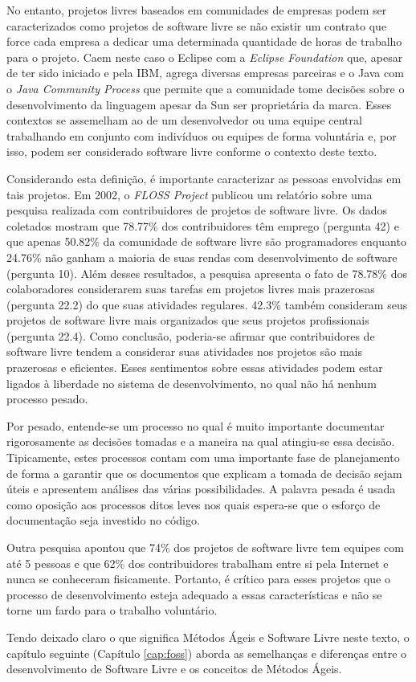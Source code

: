 No entanto, projetos livres baseados em comunidades de empresas podem
ser caracterizados como projetos de software livre se não existir um
contrato que force cada empresa a dedicar uma determinada quantidade
de horas de trabalho para o projeto. Caem neste caso o Eclipse com a
\emph{Eclipse Foundation} que, apesar de ter sido iniciado e pela IBM,
agrega diversas empresas parceiras e o Java com o \emph{Java Community
  Process} que permite que a comunidade tome decisões sobre o
desenvolvimento da linguagem apesar da Sun ser proprietária da
marca. Esses contextos se assemelham ao de um desenvolvedor ou uma
equipe central trabalhando em conjunto com indivíduos ou equipes de
forma voluntária e, por isso, podem ser considerado software livre
conforme o contexto deste texto.

Considerando esta definição, é importante caracterizar as pessoas
envolvidas em tais projetos. Em 2002, o \emph{FLOSS Project}
\cite{FlossProject} publicou um relatório sobre uma pesquisa realizada
com contribuidores de projetos de software livre. Os dados coletados
\cite{FlossStats} mostram que 78.77\% dos contribuidores têm emprego
(pergunta 42) e que apenas 50.82\% da comunidade de software livre são
programadores enquanto 24.76\% não ganham a maioria de suas rendas com
desenvolvimento de software (pergunta 10). Além desses resultados, a
pesquisa apresenta o fato de 78.78\% dos colaboradores considerarem
suas tarefas em projetos livres mais prazerosas (pergunta 22.2) do que
suas atividades regulares. 42.3\% também consideram seus projetos de
software livre mais organizados que seus projetos profissionais
(pergunta 22.4). Como conclusão, poderia-se afirmar que contribuidores
de software livre tendem a considerar suas atividades nos projetos são
mais prazerosas e eficientes. Esses sentimentos sobre essas atividades
podem estar ligados à liberdade no sistema de desenvolvimento, no qual
não há nenhum processo pesado.

Por pesado, entende-se um processo no qual é muito importante
documentar rigorosamente as decisões tomadas e a maneira na qual
atingiu-se essa decisão. Tipicamente, estes processos contam com uma
importante fase de planejamento de forma a garantir que os documentos
que explicam a tomada de decisão sejam úteis e apresentem análises das
várias possibilidades. A palavra pesada é usada como oposição aos
processos ditos leves nos quais espera-se que o esforço de
documentação seja investido no código. %

Outra pesquisa \cite{Reis2003} apontou que 74\% dos projetos de
software livre tem equipes com até 5 pessoas e que 62\% dos
contribuidores trabalham entre si pela Internet e nunca se conheceram
fisicamente. Portanto, é crítico para esses projetos que o processo de
desenvolvimento esteja adequado a essas características e não se torne
um fardo para o trabalho voluntário.

Tendo deixado claro o que significa Métodos Ágeis e Software Livre
neste texto, o capítulo seguinte (Capítulo \ref{cap:foss})
aborda as semelhanças e diferenças entre o desenvolvimento de Software
Livre e os conceitos de Métodos Ágeis.
